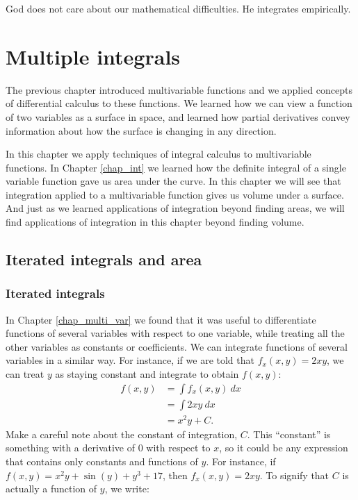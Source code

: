 \begin{savequote}[75mm]
God does not care about our mathematical difficulties. He integrates empirically.
\end{savequote}

\chapter{Multiple integrals}
\label{chap_double}
\graphicspath{{figures/Multiple/}}

The previous chapter introduced multivariable functions and we applied concepts of differential calculus to these functions. We learned how we can view a function of two variables as a surface in space, and learned how partial derivatives convey  information about how the surface is changing in any direction.

In this chapter we apply techniques of integral calculus to multivariable functions. In Chapter \ref{chap_int} we learned how the definite integral of a single variable function gave us area under the curve. In this chapter we will see that integration applied to a multivariable function gives us volume under a surface. And just as we learned applications of integration beyond finding areas, we will find applications of integration in this chapter beyond finding volume.

\section{Iterated integrals and area}\label{sec:iterated_integrals}
\subsection{Iterated integrals}
In Chapter \ref{chap_multi_var} we found that it was useful to differentiate functions of several variables with respect to one variable, while treating all the other variables as constants or coefficients. We can integrate functions of several variables in a similar way. For instance, if we are told that $f_x(x,y) = 2xy$, we can treat $y$ as staying constant and integrate to obtain $f(x,y)$:
\begin{align*}
f(x,y) &= \int\limits f_x(x,y)\ dx\\[0.2cm]
				&= \int\limits 2xy\ dx \\[0.2cm]
				&= x^2y + C.
\end{align*}
Make a careful note about the constant of integration, $C$. This ``constant'' is something with a derivative of $0$ with respect to $x$, so it could be any expression that contains only constants and functions of $y$. For instance, if $f(x,y) = x^2y+ \sin (y) + y^3 + 17$, then $f_x(x,y) = 2xy$. To signify that $C$ is actually a function of $y$, we write:

